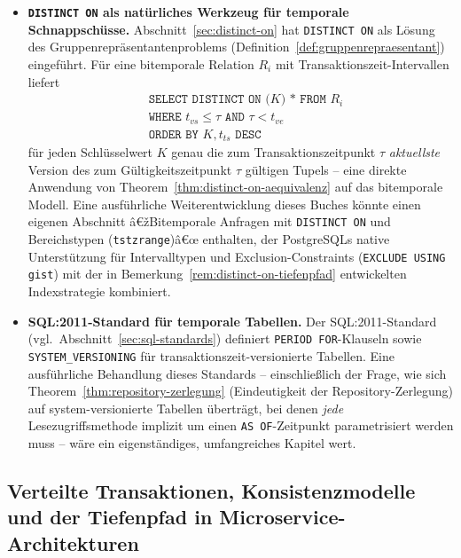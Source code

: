 ﻿\documentclass[a4paper,12pt]{report}
\theoremstyle{definition}
\theoremstyle{remark}
\begin{document}
\begin{itemize}
  \item \textbf{\texttt{DISTINCT ON} als natürliches Werkzeug für
    temporale Schnappschüsse.} Abschnitt~\ref{sec:distinct-on} hat
    \texttt{DISTINCT ON} als Lösung des
    Gruppenrepräsentantenproblems (Definition~\ref{def:gruppenrepraesentant})
    eingeführt. Für eine bitemporale Relation $R_i$ mit
    Transaktionszeit-Intervallen liefert
    \begin{align*}
      &\texttt{SELECT DISTINCT ON (}K\texttt{) * FROM } R_i\\
      &\texttt{WHERE } t_{vs}\leq\tau \texttt{ AND } \tau < t_{ve}\\
      &\texttt{ORDER BY } K, t_{ts} \texttt{ DESC}
    \end{align*}
    für jeden Schlüsselwert $K$ genau die zum
    Transaktionszeitpunkt $\tau$ \emph{aktuellste} Version des zum
    Gültigkeitszeitpunkt $\tau$ gültigen Tupels -- eine direkte
    Anwendung von Theorem~\ref{thm:distinct-on-aequivalenz} auf das
    bitemporale Modell. Eine ausführliche Weiterentwicklung dieses
    Buches könnte einen eigenen Abschnitt â€žBitemporale Anfragen mit
    \texttt{DISTINCT ON} und Bereichstypen (\texttt{tstzrange})â€œ
    enthalten, der PostgreSQLs native Unterstützung für
    Intervalltypen und Exclusion-Constraints
    (\texttt{EXCLUDE USING gist}) mit der in
    Bemerkung~\ref{rem:distinct-on-tiefenpfad} entwickelten
    Indexstrategie kombiniert.

  \item \textbf{SQL:2011-Standard für temporale Tabellen.} Der
    SQL:2011-Standard (vgl.\ Abschnitt~\ref{sec:sql-standards})
    definiert \texttt{PERIOD FOR}-Klauseln sowie
    \texttt{SYSTEM\_VERSIONING} für transaktionszeit-versionierte
    Tabellen. Eine ausführliche Behandlung dieses Standards --
    einschließlich der Frage, wie sich
    Theorem~\ref{thm:repository-zerlegung} (Eindeutigkeit der
    Repository-Zerlegung) auf system-versionierte Tabellen überträgt,
    bei denen \emph{jede} Lesezugriffsmethode implizit um einen
    \texttt{AS OF}-Zeitpunkt parametrisiert werden muss -- wäre ein
    eigenständiges, umfangreiches Kapitel wert.
\end{itemize}

\subsection{Verteilte Transaktionen, Konsistenzmodelle und der Tiefenpfad in Microservice-Architekturen}
\label{sec:ausblick-verteilt}
\end{document}
